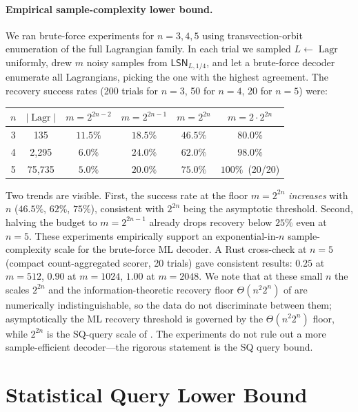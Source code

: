 \documentclass[11pt,a4paper]{article}
\theoremstyle{plain}
\theoremstyle{definition}
\DeclareMathOperator{\Lagr}{Lagr}
\newcommand{\LSN}{\mathsf{LSN}}
\begin{document}
\paragraph{Empirical sample-complexity lower bound.}
We ran brute-force experiments for $n=3,4,5$ using transvection-orbit enumeration of the full Lagrangian family.  In each trial we sampled $L\leftarrow\Lagr$ uniformly, drew $m$ noisy samples from $\LSN_{L,1/4}$, and let a brute-force decoder enumerate all Lagrangians, picking the one with the highest agreement.  The recovery success rates (200 trials for $n=3$, 50 for $n=4$, 20 for $n=5$) were:
\begin{center}
\begin{tabular}{@{}cccccc@{}}
\toprule
$n$ & $|\Lagr|$ & $m=2^{2n-2}$ & $m=2^{2n-1}$ & $m=2^{2n}$ & $m=2\cdot2^{2n}$ \\
\midrule
3 & 135 & $11.5\%$ & $18.5\%$ & $46.5\%$ & $80.0\%$ \\
4 & 2{,}295 & $6.0\%$ & $24.0\%$ & $62.0\%$ & $98.0\%$ \\
5 & 75{,}735 & $5.0\%$ & $20.0\%$ & $75.0\%$ & $100\%$~(20/20) \\
\bottomrule
\end{tabular}
\end{center}
Two trends are visible.  First, the success rate at the floor $m=2^{2n}$ \emph{increases} with $n$ ($46.5\%$, $62\%$, $75\%$), consistent with $2^{2n}$ being the asymptotic threshold.  Second, halving the budget to $m=2^{2n-1}$ already drops recovery below $25\%$ even at $n=5$.  These experiments empirically support an exponential-in-$n$ sample-complexity scale for the brute-force ML decoder.  A Rust cross-check at $n=5$ (compact count-aggregated scorer, 20 trials) gave consistent results: $0.25$ at $m=512$, $0.90$ at $m=1024$, $1.00$ at $m=2048$.  We note that at these small $n$ the scales $2^{2n}$ and the information-theoretic recovery floor $\Theta(n^2 2^n)$ of  are numerically indistinguishable, so the data do not discriminate between them; asymptotically the ML recovery threshold is governed by the $\Theta(n^2 2^n)$ floor, while $2^{2n}$ is the SQ-query scale of . The experiments do not rule out a more sample-efficient decoder---the rigorous statement is the SQ query bound.

\section{Statistical Query Lower Bound}
\label{sec:sq}
\end{document}
